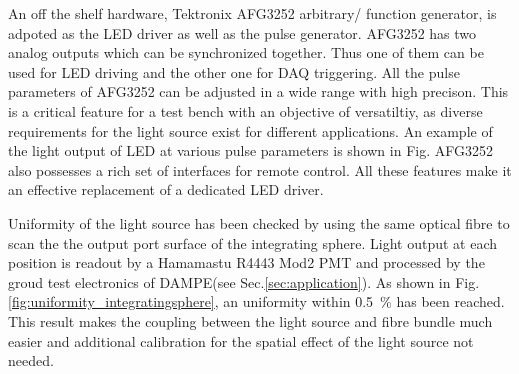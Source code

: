 \documentclass[5p, times]{elsarticle}
\begin{document}
An off the shelf hardware, Tektronix AFG3252 arbitrary/ function generator, is adpoted as the LED driver as well as the pulse generator.
AFG3252 has two analog outputs which can be synchronized together.
Thus one of them can be used for LED driving and the other one for DAQ triggering.
All the pulse parameters of AFG3252 can be adjusted in a wide range with high precison.%
This is a critical feature for a test bench with an objective of versatiltiy, as diverse requirements for the light source exist for different applications.
An example of the light output of LED at various pulse parameters is shown in Fig.
AFG3252 also possesses a rich set of interfaces for remote control.
All these features make it an effective replacement of a dedicated LED driver. 

Uniformity of the light source has been checked by using the same optical fibre to scan the the output port surface of the integrating sphere.
Light output at each position is readout by a Hamamastu R4443 Mod2 PMT and processed by the groud test electronics of DAMPE(see Sec.\ref{sec:application}). 
As shown in Fig.\ref{fig:uniformity_integratingsphere}, an uniformity within \textpm\SI{0.5}{\percent} has been reached.
This result makes the coupling between the light source and fibre bundle much easier and additional calibration for the spatial effect of the light source not needed. 

\end{document}
